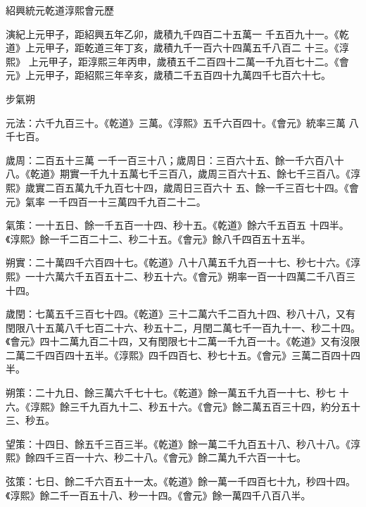 
\begin{pinyinscope}

 紹興統元乾道淳熙會元歷



 演紀上元甲子，距紹興五年乙卯，歲積九千四百二十五萬一
 千五百九十一。《乾道》上元甲子，距乾道三年丁亥，歲積九千一百六十四萬五千八百二
 十三。《淳熙》
 上元甲子，距淳熙三年丙申，歲積五千二百四十二萬一千九百七十二。《會元》上元甲子，距紹熙三年辛亥，歲積二千五百四十九萬四千七百六十七。



 步氣朔



 元法：六千九百三十。《乾道》三萬。《淳熙》五千六百四十。《會元》統率三萬
 八千七百。



 歲周：二百五十三萬
 一千一百三十八；歲周日：三百六十五、餘一千六百八十八。《乾道》期實一千九十五萬七千三百八，歲周三百六十五、餘七千三百八。《淳熙》歲實二百五萬九千九百七十四，歲周日三百六十
 五、餘一千三百七十四。《會元》氣率
 一千四百一十三萬四千九百二十二。



 氣策：一十五日、餘一千五百一十四、秒十五。《乾道》餘六千五百五
 十四半。《淳熙》餘一千二百二十二、秒二十五。《會元》餘八千四百五十五半。



 朔實：二十萬四千六百四十七。《乾道》八十八萬五千九百一十七、秒七十六。《淳熙》一十六萬六千五百五十二、秒五十六。《會元》朔率一百一十四萬二千八百三十四。



 歲閏：七萬五千三百七十四。《乾道》三十二萬六千二百九十四、秒八十八，又有閏限八十五萬八千七百二十六、秒五十二，月閏二萬七千一百九十一、秒二十四。《會元》四十二萬九百二十四，又有閏限七十二萬一千九百一十。《乾道》又有沒限二萬二千四百四十五半。《淳熙》四千四百七、秒七十五。《會元》三萬二百四十四半。



 朔策：二十九日、餘三萬六千七十七。《乾道》餘一萬五千九百一十七、秒七
 十六。《淳熙》餘三千九百九十二、秒五十六。《會元》餘二萬五百三十四，約分五十三、秒五。



 望策：十四日、餘五千三百三半。《乾道》餘一萬二千九百五十八、秒八十八。《淳熙》餘四千三百一十六、秒二十八。《會元》餘二萬九千六百一十七。



 弦策：七日、餘二千六百五十一太。《乾道》餘一萬一千四百七十九，秒四十四。《淳熙》餘二千一百五十八、秒一十四。《會元》餘一萬四千八百八半。




\end{pinyinscope}
